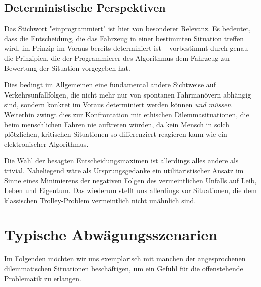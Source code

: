 \documentclass[twocolumn, german]{tum-article}
\begin{document}
\subsection{Deterministische Perspektiven}
Das Stichwort "einprogrammiert" ist hier von besonderer Relevanz.
Es bedeutet, dass die Entscheidung, die das Fahrzeug in einer bestimmten Situation treffen wird, im Prinzip im Voraus bereits determiniert ist -- vorbestimmt durch genau die Prinzipien, die der Programmierer des Algorithmus dem Fahrzeug zur Bewertung der Situation vorgegeben hat. 

Dies bedingt im Allgemeinen eine fundamental andere Sichtweise auf Verkehrsunfallfolgen, die nicht mehr nur von spontanen Fahrmanövern abhängig sind, sondern konkret im Voraus determiniert werden können \textit{und müssen}.
Weiterhin zwingt dies zur Konfrontation mit ethischen Dilemmasituationen, die beim menschlichen Fahren nie auftreten würden, da kein Mensch in solch plötzlichen, kritischen Situationen so differenziert reagieren kann wie ein elektronischer Algorithmus.

Die Wahl der besagten Entscheidungsmaximen ist allerdings alles andere als trivial.
Naheliegend wäre als Ursprungsgedanke ein utilitaristischer Ansatz im Sinne eines Minimierens der negativen Folgen des vermeintlichen Unfalls auf Leib, Leben und Eigentum.
Das wiederum stellt uns allerdings vor Situationen, die dem klassischen Trolley-Problem vermeintlich nicht unähnlich sind.


\section{Typische Abwägungsszenarien}
Im Folgenden möchten wir uns exemplarisch mit manchen der angesprochenen dilemmatischen Situationen beschäftigen, um ein Gefühl für die offenstehende Problematik zu erlangen.
\end{document}
